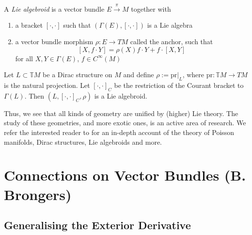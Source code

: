 \begin{definition}
  A \emph{Lie algebroid} is a vector bundle $E\xrightarrow{\pi}M$ together with
  \begin{enumerate}
      \item a bracket $[\cdot,\cdot]$ such that $(\Gamma(E),[\cdot,\cdot])$ is a Lie algebra
      \item a vector bundle morphism $\rho:E\to TM$ called the anchor, such that
      $$[X,f\cdot Y]=\rho(X)f\cdot Y+f\cdot[X,Y]$$
      for all $X,Y\in\Gamma(E)$, $f\in C^\infty(M)$
  \end{enumerate}
\end{definition}
\begin{example}
  Let $L\subset\mathbb{T}M$ be a Dirac structure on $M$ and define $\rho:=\text{pr}|_L$, where $\text{pr}:\mathbb{T}M\to TM$ is the natural projection. Let $[\cdot,\cdot]_C$ be the restriction of the Courant bracket to $\Gamma(L)$. Then $(L,[\cdot,\cdot]_C,\rho)$ is a Lie algebroid.
\end{example}
Thus, we see that all kinds of geometry are unified by (higher) Lie theory. The study of these geometries, and more exotic ones, is an active area of research. We refer the interested reader to \cite{Crainic_2021} for an in-depth account of the theory of Poisson manifolds, Dirac structures, Lie algebroids and more.

\chapter{Connections on Vector Bundles (B. Brongers)}

\section{Generalising the Exterior Derivative}

